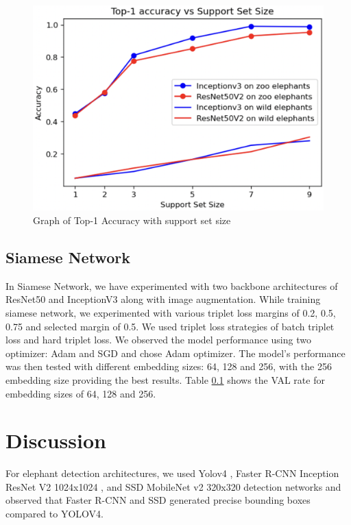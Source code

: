 \documentclass[10pt,twocolumn,letterpaper]{article}
\begin{document}
\begin{figure}[t]
  \centering
  \includegraphics[scale=0.45]{few_shot_graph}
   \caption{Graph of Top-1 Accuracy with support set size}
   \label{fig:few_shot_graph}
\end{figure}

\subsection{Siamese Network}

In Siamese Network, we have  experimented with two backbone architectures of ResNet50 and InceptionV3 along with image augmentation. While training siamese network, we experimented with various triplet loss margins of 0.2, 0.5, 0.75 and selected margin of 0.5. We used triplet loss strategies of batch triplet loss and hard triplet loss. We observed the model performance using two optimizer: Adam and SGD and chose Adam optimizer. The model's performance was then tested with different embedding sizes: 64, 128 and 256, with the 256 embedding size providing the best results. Table \ref{} shows the VAL rate for embedding sizes of 64, 128 and 256.


\section{Discussion}
\label{sec:discussion}

For elephant detection architectures, we used Yolov4 \cite{yolov4}, Faster R-CNN Inception ResNet V2 1024x1024 \cite{fasterrcnn}, and SSD MobileNet v2 320x320 detection networks and observed that Faster R-CNN and SSD generated precise bounding boxes compared to YOLOV4.
\end{document}
